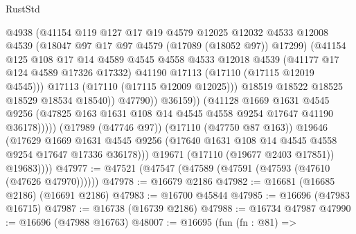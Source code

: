 \begin{lexlean}{RustStd}
\begin{coremodule}
                                @4938
                                (@41154
                                  @119
                                  @127
                                  @17
                                  @19
                                  @4579
                                  @12025
                                  @12032
                                  @4533
                                  @12008
                                  @4539
                                  (@18047 @97 @17 @97 @4579 (@17089 (@18052 @97)) @17299)
                                  (@41154
                                    @125
                                    @108
                                    @17
                                    @14
                                    @4589
                                    @4545
                                    @4558
                                    @4533
                                    @12018
                                    @4539
                                    (@41177 @17 @124 @4589 @17326 @17332)
                                    @41190
                                    @17113
                                    (@17110 (@17115 @12019 @4545)))
                                  @17113
                                  (@17110 (@17115 @12009 @12025)))
                                @18519
                                @18522
                                @18525
                                @18529
                                @18534
                                @18540))
                            @47790))
                        @36159))
                    (@41128
                      @1669
                      @1631
                      @4545
                      @9256
                      (@47825 @163 @1631 @108 @14 @4545 @4558 @9254 @17647 @41190 @36178)))))
              (@17989 (@47746 @97))
              (@17110 (@47750 @87 @163))
              @19646
              (@17629
                @1669
                @1631
                @4545
                @9256
                (@17640 @1631 @108 @14 @4545 @4558 @9254 @17647 @17336 @36178)))
            @19671
            (@17110 (@19677 @2403 @17851))
            @19683))))
@47977 := @47521 (@47547 (@47589 (@47591 (@47593 (@47610 (@47626 @47970))))))
@47978 := @16679 @2186
@47982 := @16681 (@16685 @2186) (@16691 @2186)
@47983 := @16700 @45844
@47985 := @16696 (@47983 @16715)
@47987 := @16738 (@16739 @2186)
@47988 := @16734 @47987
@47990 := @16696 (@47988 @16763)
@48007 := @16695
    (fun (fn : @81) =>

\end{coremodule}
\end{lexlean}
